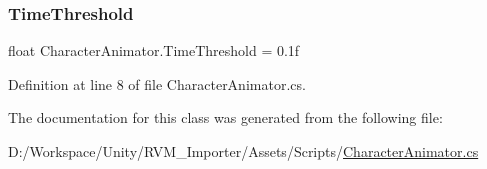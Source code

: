 \subsubsection{\texorpdfstring{TimeThreshold}{TimeThreshold}}
{\footnotesize\ttfamily float Character\+Animator.\+Time\+Threshold = 0.\+1f}



Definition at line 8 of file Character\+Animator.\+cs.



The documentation for this class was generated from the following file\+:\begin{DoxyCompactItemize}
\item 
D\+:/\+Workspace/\+Unity/\+R\+V\+M\+\_\+\+Importer/\+Assets/\+Scripts/\mbox{\hyperlink{_character_animator_8cs}{Character\+Animator.\+cs}}\end{DoxyCompactItemize}
